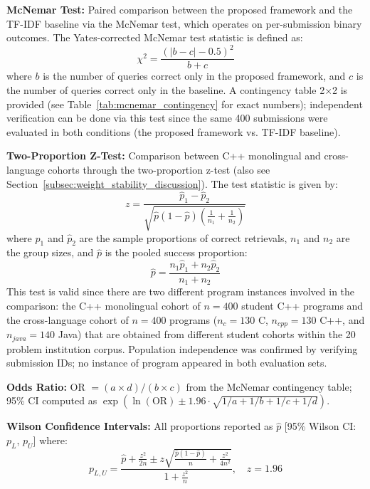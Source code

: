 \textbf{McNemar Test:} Paired comparison between the proposed framework and the TF-IDF baseline via the McNemar test, which operates on per-submission binary outcomes. The Yates-corrected McNemar test statistic is defined as:
\begin{equation}
\chi^2 = \frac{(|b - c| - 0.5)^2}{b + c}
\end{equation}
where $b$ is the number of queries correct only in the proposed framework, and $c$ is the number of queries correct only in the baseline. A contingency table 2$\times$2 is provided (see Table~\ref{tab:mcnemar_contingency} for exact numbers); independent verification can be done via this test since the same 400 submissions were evaluated in both conditions (the proposed framework vs. TF-IDF baseline).

\textbf{Two-Proportion Z-Test:} Comparison between C++ monolingual and cross-language cohorts through the two-proportion z-test (also see Section~\ref{subsec:weight_stability_discussion}). The test statistic is given by:
\begin{equation}
z = \frac{\hat{p}_1 - \hat{p}_2}{\sqrt{\hat{p}(1-\hat{p})\left(\frac{1}{n_1} + \frac{1}{n_2}\right)}}
\end{equation}
where $\hat{p}_1$ and $\hat{p}_2$ are the sample proportions of correct retrievals, $n_1$ and $n_2$ are the group sizes, and $\hat{p}$ is the pooled success proportion:
\begin{equation}
\hat{p} = \frac{n_1\hat{p}_1 + n_2\hat{p}_2}{n_1 + n_2}
\end{equation}
This test is valid since there are two different program instances involved in the comparison: the C++ monolingual cohort of $n=400$ student C++ programs and the cross-language cohort of $n=400$ programs ($n_{c}=130$ C, $n_{cpp}=130$ C++, and $n_{java}=140$ Java) that are obtained from different student cohorts within the 20 problem institution corpus. Population independence was confirmed by verifying submission IDs; no instance of program appeared in both evaluation sets.

\textbf{Odds Ratio:} OR $= (a \times d)/(b \times c)$ from the McNemar contingency table; 95\% CI computed as $\exp(\ln(\text{OR}) \pm 1.96 \cdot \sqrt{1/a + 1/b + 1/c + 1/d})$.

\textbf{Wilson Confidence Intervals:} All proportions reported as $\hat{p}$ [95\% Wilson CI: $p_L$, $p_U$] where:
\begin{equation}
p_{L,U} = \frac{\hat{p} + \frac{z^2}{2n} \pm z\sqrt{\frac{\hat{p}(1-\hat{p})}{n} + \frac{z^2}{4n^2}}}{1 + \frac{z^2}{n}}, \quad z = 1.96
\end{equation}

